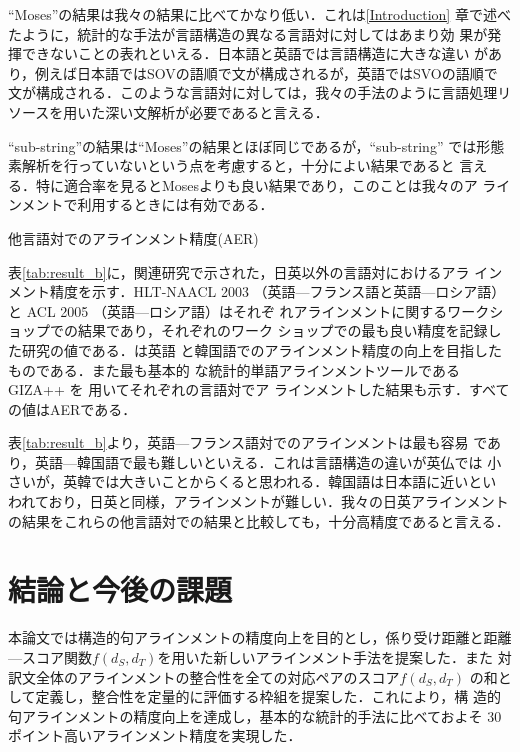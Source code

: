 \documentclass[japanese]{jnlp_1.4}
\begin{document}
``Moses''の結果は我々の結果に比べてかなり低い．これは\ref{Introduction} 
章で述べたように，統計的な手法が言語構造の異なる言語対に対してはあまり効
果が発揮できないことの表れといえる．日本語と英語では言語構造に大きな違い
があり，例えば日本語ではSOVの語順で文が構成されるが，英語ではSVOの語順で
文が構成される．このような言語対に対しては，我々の手法のように言語処理リ
ソースを用いた深い文解析が必要であると言える．


``sub-string''の結果は``Moses''の結果とほぼ同じであるが，``sub-string'' 
では形態素解析を行っていないという点を考慮すると，十分によい結果であると
言える．特に適合率を見るとMosesよりも良い結果であり，このことは我々のア
ラインメントで利用するときには有効である．

\begin{table}[b]
 \begin{center}
  \caption{他言語対でのアラインメント精度(AER)}
  \label{tab:result_b}

 \end{center}
\end{table}


表\ref{tab:result_b}に，関連研究で示された，日英以外の言語対におけるアラ
インメント精度を示す．HLT-NAACL 2003 \cite{mihalcea-pedersen:2003:Partext}
（英語—フランス語と英語—ロシア語）と
ACL 2005 \cite{martin-mihalcea-pedersen:2005:WPT}（英語—ロシア語）はそれぞ
れアラインメントに関するワークショップでの結果であり，それぞれのワーク
ショップでの最も良い精度を記録した研究の値である．\cite{Gildea03}は英語
と韓国語でのアラインメント精度の向上を目指したものである．また最も基本的
な統計的単語アラインメントツールであるGIZA++ \cite{rodriguez-garciavarea-gamez:2006:WMT}を
用いてそれぞれの言語対でア
ラインメントした結果も示す．すべての値はAERである．


表\ref{tab:result_b}より，英語—フランス語対でのアラインメントは最も容易
であり，英語—韓国語で最も難しいといえる．これは言語構造の違いが英仏では
小さいが，英韓では大きいことからくると思われる．韓国語は日本語に近いとい
われており，日英と同様，アラインメントが難しい．我々の日英アラインメント
の結果をこれらの他言語対での結果と比較しても，十分高精度であると言える．




\section{結論と今後の課題}

本論文では構造的句アラインメントの精度向上を目的とし，係り受け距離と距離—スコア関数$f(d_S, d_T)$を用いた新しいアラインメント手法を提案した．また
対訳文全体のアラインメントの整合性を全ての対応ペアのスコア$f(d_S, d_T)$
の和として定義し，整合性を定量的に評価する枠組を提案した．これにより，構
造的句アラインメントの精度向上を達成し，基本的な統計的手法に比べておよそ
30ポイント高いアラインメント精度を実現した．
\end{document}
